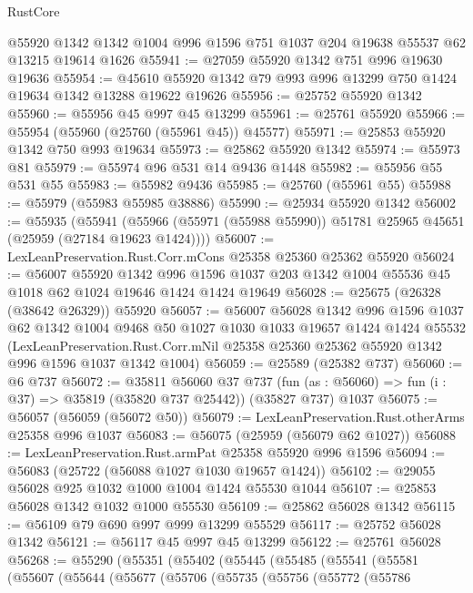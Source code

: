 \begin{lexlean}{RustCore}
\begin{coremodule}
    @55920
    @1342
    @1342
    @1004
    @996
    @1596
    @751
    @1037
    @204
    @19638
    @55537
    @62
    @13215
    @19614
    @1626
@55941 := @27059 @55920 @1342 @751 @996 @19630 @19636
@55954 := @45610 @55920 @1342 @79 @993 @996 @13299 @750 @1424 @19634 @1342 @13288 @19622 @19626
@55956 := @25752 @55920 @1342
@55960 := @55956 @45 @997 @45 @13299
@55961 := @25761 @55920
@55966 := @55954 (@55960 (@25760 (@55961 @45)) @45577)
@55971 := @25853 @55920 @1342 @750 @993 @19634
@55973 := @25862 @55920 @1342
@55974 := @55973 @81
@55979 := @55974 @96 @531 @14 @9436 @1448
@55982 := @55956 @55 @531 @55
@55983 := @55982 @9436
@55985 := @25760 (@55961 @55)
@55988 := @55979 (@55983 @55985 @38886)
@55990 := @25934 @55920 @1342
@56002 := @55935
    (@55941 (@55966 (@55971 (@55988 @55990)) @51781 @25965 @45651 (@25959 (@27184 @19623 @1424))))
@56007 := LexLeanPreservation.Rust.Corr.mCons @25358 @25360 @25362 @55920
@56024 := @56007
    @55920
    @1342
    @996
    @1596
    @1037
    @203
    @1342
    @1004
    @55536
    @45
    @1018
    @62
    @1024
    @19646
    @1424
    @1424
    @19649
@56028 := @25675 (@26328 (@38642 @26329)) @55920
@56057 := @56007
    @56028
    @1342
    @996
    @1596
    @1037
    @62
    @1342
    @1004
    @9468
    @50
    @1027
    @1030
    @1033
    @19657
    @1424
    @1424
    @55532
    (LexLeanPreservation.Rust.Corr.mNil
      @25358
      @25360
      @25362
      @55920
      @1342
      @996
      @1596
      @1037
      @1342
      @1004)
@56059 := @25589 (@25382 @737)
@56060 := @6 @737
@56072 := @35811
    @56060
    @37
    @737
    (fun (as : @56060) => fun (i : @37) => @35819 (@35820 @737 @25442))
    (@35827 @737)
    @1037
@56075 := @56057 (@56059 (@56072 @50))
@56079 := LexLeanPreservation.Rust.otherArms @25358 @996 @1037
@56083 := @56075 (@25959 (@56079 @62 @1027))
@56088 := LexLeanPreservation.Rust.armPat @25358 @55920 @996 @1596
@56094 := @56083 (@25722 (@56088 @1027 @1030 @19657 @1424))
@56102 := @29055 @56028 @925 @1032 @1000 @1004 @1424 @55530 @1044
@56107 := @25853 @56028 @1342 @1032 @1000 @55530
@56109 := @25862 @56028 @1342
@56115 := @56109 @79 @690 @997 @999 @13299 @55529
@56117 := @25752 @56028 @1342
@56121 := @56117 @45 @997 @45 @13299
@56122 := @25761 @56028
@56268 := @55290
    (@55351
      (@55402
        (@55445
          (@55485
            (@55541
              (@55581
                (@55607
                  (@55644
                    (@55677
                      (@55706
                        (@55735
                          (@55756
                            (@55772
                              (@55786

\end{coremodule}
\end{lexlean}
